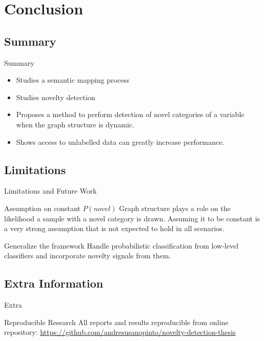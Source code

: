 \documentclass[compress]{beamer}
\begin{document}
\section{Conclusion}
\subsection{Summary}
\begin{frame}{Summary}
    \begin{itemize}
        \item Studies a semantic mapping process
        \item Studies novelty detection
        \item Proposes a method to perform detection of novel categories
              of a variable when the graph structure is dynamic.
        \item Shows access to unlabelled data can greatly increase performance.
    \end{itemize}
\end{frame}

\subsection{Limitations}
\begin{frame}{Limitations and Future Work}
    \begin{block}{Assumption on constant $P(novel)$}
        Graph structure plays a role on the likelihood a sample with a novel
        category is drawn. Assuming it to be constant is a very strong assumption
        that is not expected to hold in all scenarios.
    \end{block}
    \begin{block}
        {Generalize the framework}
        Handle probabilistic classification from low-level classifiers and incorporate novelty signals from them.
    \end{block}
\end{frame}

\subsection{Extra Information}
\begin{frame}{Extra}
    \begin{block}{Reproducible Research}
        All reports and results reproducible from online repository:
        \url{https://github.com/andresusanopinto/novelty-detection-thesis}
    \end{block}
\end{frame}

\appendix
% 
% 
% 
\begin{frame}
 \titlepage
\end{frame}
\end{document}

